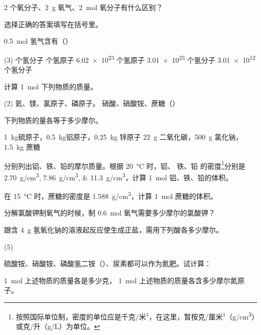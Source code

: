 \begin{Practice}[习题]
  \begin{question}
    \item 2 个氧分子、\qty{2}{g} 氧气、\qty{2}{mol} 氧分子有什么区别？
    \item 选择正确的答案填写在括号里。
    
    \noindent\qty{0.5}{mol} 氢气含有（\hspace{2em}）
    \begin{tasks}(3)
       个氢分子
       个氢原子
      \task \num{6.02e23} 个氢原子
      \task \num{3.01e23} 个氢分子
      \task \num{3.01e12} 个氢分子
    \end{tasks}
    \item 计算 \qty{1}{mol} 下列物质的质量。
    \begin{tasks}(2)
      \task 氦、镁、氯原子、磷原子。
      \task 硝酸、硝酸铵、蔗糖（）
    \end{tasks}
    \item 下列物质的量各等于多少摩尔。
    \begin{tasks}
      \task \qty{1}{kg}硫原子，\qty{0.5}{kg}铝原子，\qty{0.25}{kg} 锌原子
      \task \qty{22}{g} 二氧化碳，\qty{500}{g} 氯化钠，\qty{1.5}{kg} 蔗糖
    \end{tasks}
    \item 分别列出铝、铁、铅的摩尔质量。根据 \qty{20}{\celsius} 时，铝、 铁、铅 的密度\footnote{按照国际单位制，密度的单位应是千克/米$^3$，在这里，暂按克/厘米$^3$（\unit{g/cm^3}）或克/升（\unit{g/L}）为单位。}分别是 \qtylist{2.70;7.86;11.3}{g/cm^3}，计算 \qty{1}{mol} 铝、铁、铅的体积。
    \item 在 \qty{15}{\celsius} 时，蔗糖的密度是 \qty{1.588}{g/cm^3}，计算 \qty{1}{mol} 蔗糖的体积。
    \item 分解氯酸钾制氧气的时候，制 \qty{0.6}{mol} 氧气需要多少摩尔的氯酸钾？
    \item 跟含 \qty{4}{g} 氢氧化钠的溶液起反应使生成正盐，需用下列酸各多少摩尔。
    \begin{tasks}(5)
      \task {}
      \task {}
      \task {}
      \task {}
      \task {}
    \end{tasks}
    \item 硫酸铵、硝酸铵、磷酸氢二铵（）、尿素都可以作为氮肥。试计算：
    \begin{tasks}
      \task \qty{1}{mol} 上述物质的质量各是多少克，
      \task \qty{1}{mol} 上述物质的质量各含多少摩尔氮原子。
    \end{tasks}
  \end{question}
\end{Practice}

